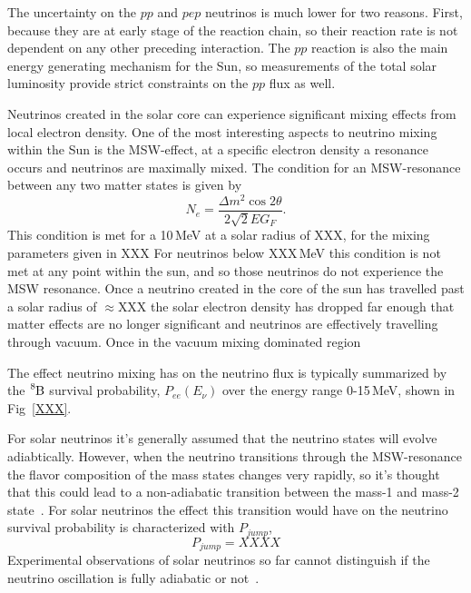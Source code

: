 The uncertainty on the $pp$ and $pep$ neutrinos is much lower for two reasons. First, because
they are at early stage of the reaction chain, so their reaction rate is not dependent on any
other preceding interaction. The $pp$ reaction is also the main energy generating mechanism
for the Sun, so measurements of the total solar luminosity provide strict constraints on the
$pp$ flux as well.

Neutrinos created in the solar core can experience significant mixing effects from local
electron density.
One of the most interesting aspects to neutrino mixing within the Sun is the MSW-effect,
at a specific electron density a resonance occurs and neutrinos are maximally mixed.
The condition for an MSW-resonance between any two matter states is given by
\begin{equation}
    N_{e} = \frac{\Delta m^{2} \cos2\theta}{2\sqrt{2}EG_{F}}\text{.}
\end{equation}
This condition is met for a 10\,MeV at a solar radius of XXX, for the mixing parameters
given in XXX %
For neutrinos below XXX\,MeV this condition is not met at any point within the sun,
and so those neutrinos do not experience the MSW resonance.
Once a neutrino created in the core of the sun has travelled past a solar radius of $\approx$XXX
the solar electron density has dropped far enough that matter effects are no longer significant
and neutrinos are effectively travelling through vacuum. Once in the vacuum mixing dominated region

The effect neutrino mixing has on the neutrino flux is typically summarized by the
$\ce{^{8}B}$ survival probability, $P_{ee}(E_{\nu})$ over the energy range 0-15\,MeV,
shown in Fig~\ref{XXX}.

For solar neutrinos it's generally assumed that the neutrino states
will evolve adiabtically.
However, when the neutrino transitions through the MSW-resonance
the flavor composition of the mass states changes very rapidly,
so it's thought that this could lead to a non-adiabatic transition
between the mass-1 and mass-2 state~\cite{FIND CITATION}.
For solar neutrinos the effect this transition would have on the
neutrino survival probability is characterized with $P_{jump}$,
\begin{equation}
    P_{jump} = XXXX
\end{equation}
Experimental observations of solar neutrinos so far cannot distinguish if the
neutrino oscillation is fully adiabatic or not~\cite{GDOG Everything Under the sun???XXX}.




